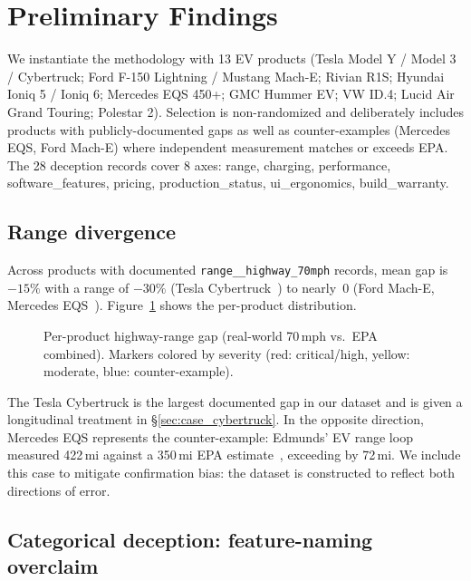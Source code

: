 \documentclass{article}
\begin{document}
\section{Preliminary Findings}\label{sec:findings}

We instantiate the methodology with 13 EV products (Tesla Model Y / Model 3 / Cybertruck; Ford F-150 Lightning / Mustang Mach-E; Rivian R1S; Hyundai Ioniq 5 / Ioniq 6; Mercedes EQS 450+; GMC Hummer EV; VW ID.4; Lucid Air Grand Touring; Polestar 2). Selection is non-randomized and deliberately includes products with publicly-documented gaps as well as counter-examples (Mercedes EQS, Ford Mach-E) where independent measurement matches or exceeds EPA. The 28 deception records cover 8 axes: range, charging, performance, software\_features, pricing, production\_status, ui\_ergonomics, build\_warranty.

\subsection{Range divergence}

Across products with documented \texttt{range\_\_highway\_70mph} records, mean gap is $-15\%$ with a range of $-30\%$ (Tesla Cybertruck~\cite{mt_cybertruck_2024}) to nearly~$0$ (Ford Mach-E, Mercedes EQS~\cite{cd_eqs_2021}). Figure~\ref{fig:gap-dotplot} shows the per-product distribution.

\begin{figure}[!htbp]
\centering

\caption{Per-product highway-range gap (real-world 70\,mph vs.\ EPA combined). Markers colored by severity (red: critical/high, yellow: moderate, blue: counter-example).}
\label{fig:gap-dotplot}
\end{figure}

The Tesla Cybertruck is the largest documented gap in our dataset and is given a longitudinal treatment in \S\ref{sec:case_cybertruck}. In the opposite direction, Mercedes EQS represents the counter-example: Edmunds' EV range loop measured 422\,mi against a 350\,mi EPA estimate~\cite{cd_eqs_2021}, exceeding by 72\,mi. We include this case to mitigate confirmation bias: the dataset is constructed to reflect both directions of error.

\subsection{Categorical deception: feature-naming overclaim}
\end{document}
